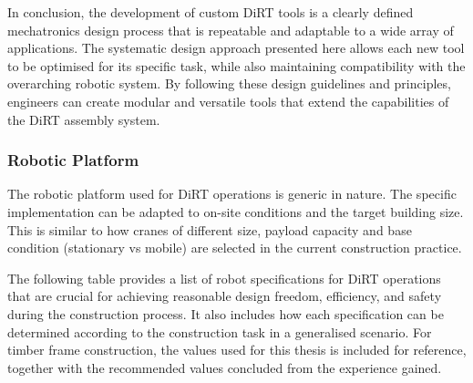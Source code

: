 \documentclass[11pt]{book}
\begin{document}
In conclusion, the development of custom DiRT tools is a clearly defined mechatronics design process that is repeatable and adaptable to a wide array of applications. The systematic design approach presented here allows each new tool to be optimised for its specific task, while also maintaining compatibility with the overarching robotic system. By following these design guidelines and principles, engineers can create modular and versatile tools that extend the capabilities of the DiRT assembly system. 

\subsubsection{Robotic Platform}

The robotic platform used for DiRT operations is generic in nature. The specific implementation can be adapted to on-site conditions and the target building size. This is similar to how cranes of different size, payload capacity and base condition (stationary vs mobile) are selected in the current construction practice. 

The following table provides a list of robot specifications for DiRT operations that are crucial for achieving reasonable design freedom, efficiency, and safety during the construction process. It also includes how each specification can be determined according to the construction task in a generalised scenario. For timber frame construction, the values used for this thesis is included for reference, together with the recommended values concluded from the experience gained.
\end{document}
